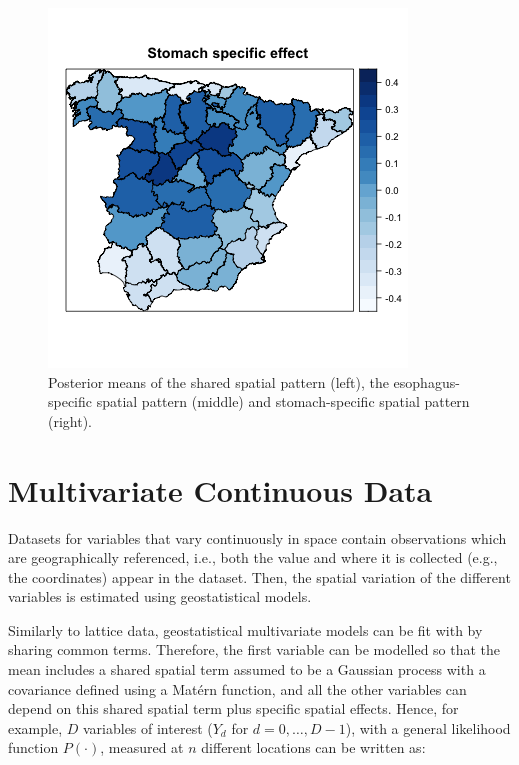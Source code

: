 \begin{figure}[h!]
\begin{center}
\includegraphics[scale=0.35]{images/Spain_Stomach_specific.png}
\end{center}
\caption{Posterior means of the shared spatial pattern (left), the esophagus-specific spatial pattern (middle) and stomach-specific spatial pattern (right).}
\label{fig:spain}
\end{figure}








\section{Multivariate Continuous Data}
\label{sec:mgeo}


\medskip
Datasets for variables that vary continuously in space contain observations which are geographically referenced, i.e., both the value and where it is collected (e.g., the coordinates) appear in the dataset. Then, the spatial variation of the different variables is estimated using geostatistical models.




\medskip
Similarly to lattice data, geostatistical multivariate models can be fit with  by sharing common terms.  Therefore, the first variable can be modelled so that the mean includes a shared spatial term assumed to be a Gaussian process with a covariance defined using a Mat\'ern function, and all the other variables can depend on this shared spatial term plus specific spatial effects. Hence, for example, $D$ variables of interest ($Y_d$ for $d=0, \ldots, D-1$), with a general likelihood function $P(\cdot)$, measured at $n$ different locations can be written as: 

